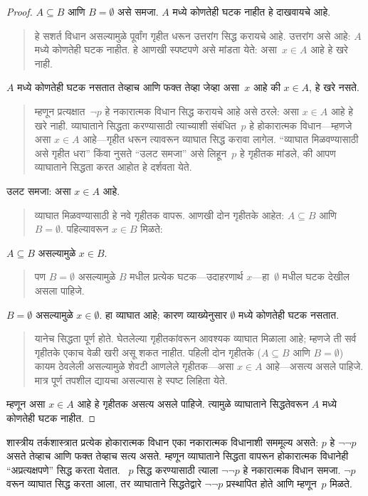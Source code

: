 \begin{proof}
$A \subseteq B$ आणि $B = \emptyset$ असे समजा. $A$ मध्ये कोणतेही घटक नाहीत हे दाखवायचे आहे.
\begin{quote}
हे सशर्त विधान असल्यामुळे पूर्वांग गृहीत धरून उत्तरांग सिद्ध करायचे आहे. उत्तरांग असे आहे: $A$ मध्ये कोणतेही घटक नाहीत. हे आणखी स्पष्टपणे असे मांडता येते: असा~$x \in A$ आहे हे खरे नाही.
\end{quote}
$A$ मध्ये कोणतेही घटक नसतात तेव्हाच आणि फक्त तेव्हा जेव्हा असा~$x$ आहे की $x \in A$, हे खरे नसते.
\begin{quote}
म्हणून प्रत्यक्षात~$\lnot p$ हे नकारात्मक विधान सिद्ध करायचे आहे असे ठरले: असा $x \in A$ आहे हे खरे नाही. व्याघाताने सिद्धता करण्यासाठी त्याच्याशी संबंधित~$p$ हे होकारात्मक विधान---म्हणजे असा $x \in A$ आहे---गृहीत धरून त्यावरून व्याघात सिद्ध करावा लागेल. “व्याघात मिळवण्यासाठी असे गृहीत धरा” किंवा नुसते “उलट समजा” असे लिहून~$p$ हे गृहीतक मांडले, की आपण व्याघाताने सिद्धता करत आहोत हे दर्शवता येते.
\end{quote}
उलट समजा: असा $x \in A$ आहे.
\begin{quote}
व्याघात मिळवण्यासाठी हे नवे गृहीतक वापरू. आणखी दोन गृहीतके आहेत: $A \subseteq B$ आणि $B = \emptyset$. पहिल्यावरून $x \in B$ मिळते:
\end{quote}
$A \subseteq B$ असल्यामुळे $x \in B$.
\begin{quote}
पण $B = \emptyset$ असल्यामुळे $B$ मधील प्रत्येक घटक---उदाहरणार्थ $x$---हा~$\emptyset$ मधील घटक देखील असला पाहिजे.
\end{quote}
$B = \emptyset$ असल्यामुळे $x \in \emptyset$. हा व्याघात आहे; कारण व्याख्येनुसार $\emptyset$ मध्ये कोणतेही घटक नसतात.
\begin{quote}
यानेच सिद्धता पूर्ण होते. घेतलेल्या गृहीतकांवरून आवश्यक व्याघात मिळाला आहे; म्हणजे ती सर्व गृहीतके एकाच वेळी खरी असू शकत नाहीत. पहिली दोन गृहीतके ($A \subseteq B$ आणि $B = \emptyset$) कायम ठेवलेली असल्यामुळे शेवटी आणलेले गृहीतक---असा $x \in A$ आहे---असत्य असले पाहिजे. मात्र पूर्ण तपशील द्यायचा असल्यास हे स्पष्ट लिहिता येते.
\end{quote}
म्हणून असा $x \in A$ आहे हे गृहीतक असत्य असले पाहिजे. त्यामुळे व्याघाताने सिद्धतेवरून $A$ मध्ये कोणतेही घटक नाहीत.
\end{proof}

शास्त्रीय तर्कशास्त्रात प्रत्येक होकारात्मक विधान एका नकारात्मक विधानाशी सममूल्य असते: $p$ हे $\lnot\lnot p$ असते तेव्हाच आणि फक्त तेव्हाच सत्य असते. म्हणून व्याघाताने सिद्धता वापरून होकारात्मक विधानेही “अप्रत्यक्षपणे” सिद्ध करता येतात. ~$p$ सिद्ध करण्यासाठी त्याला $\lnot\lnot p$ हे नकारात्मक विधान समजा. $\lnot p$ वरून व्याघात सिद्ध करता आला, तर व्याघाताने सिद्धतेद्वारे $\lnot\lnot p$ प्रस्थापित होते आणि म्हणून~$p$ मिळते.

